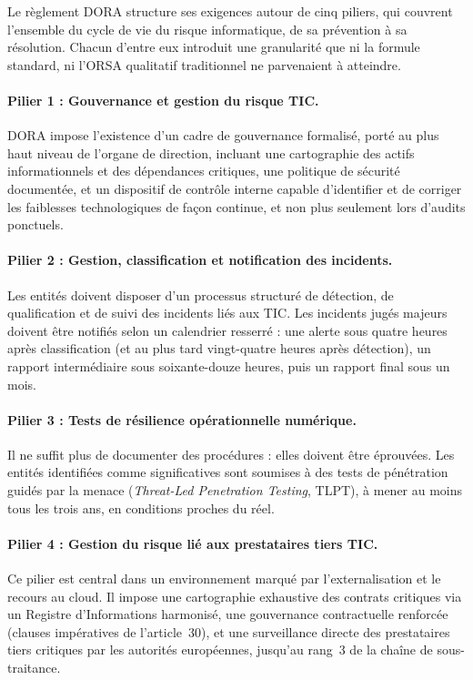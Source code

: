 

Le règlement DORA structure ses exigences autour de cinq piliers, qui couvrent
l'ensemble du cycle de vie du risque informatique, de sa prévention à sa
résolution. Chacun d'entre eux introduit une granularité que ni la formule
standard, ni l'ORSA qualitatif traditionnel ne parvenaient à atteindre.

\paragraph{Pilier 1 : Gouvernance et gestion du risque TIC.} DORA impose
l'existence d'un cadre de gouvernance formalisé, porté au plus haut niveau de
l'organe de direction, incluant une cartographie des actifs informationnels et
des dépendances critiques, une politique de sécurité documentée, et un
dispositif de contrôle interne capable d'identifier et de corriger les
faiblesses technologiques de façon continue, et non plus seulement lors
d'audits ponctuels.

\paragraph{Pilier 2 : Gestion, classification et notification des incidents.}
Les entités doivent disposer d'un processus structuré de détection, de
qualification et de suivi des incidents liés aux TIC. Les incidents jugés
majeurs doivent être notifiés selon un calendrier resserré : une alerte sous
quatre heures après classification (et au plus tard vingt-quatre heures après
détection), un rapport intermédiaire sous soixante-douze heures, puis un
rapport final sous un mois.

\paragraph{Pilier 3 : Tests de résilience opérationnelle numérique.} Il ne
suffit plus de documenter des procédures : elles doivent être éprouvées. Les
entités identifiées comme significatives sont soumises à des tests de
pénétration guidés par la menace (\emph{Threat-Led Penetration Testing},
TLPT), à mener au moins tous les trois ans, en conditions proches du réel.

\paragraph{Pilier 4 : Gestion du risque lié aux prestataires tiers TIC.}
Ce pilier est central dans un environnement marqué par l'externalisation et le
recours au cloud. Il impose une cartographie exhaustive des contrats
critiques via un Registre d'Informations harmonisé, une gouvernance
contractuelle renforcée (clauses impératives de l'article~30), et une
surveillance directe des prestataires tiers critiques par les autorités
européennes, jusqu'au rang~3 de la chaîne de sous-traitance.

